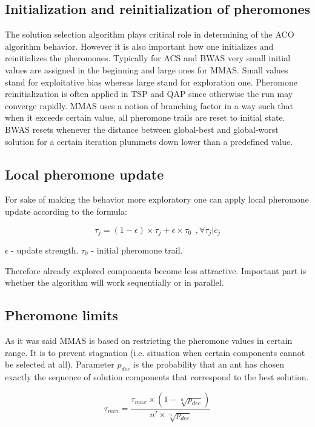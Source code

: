 \subsection{Initialization and reinitialization of pheromones}

The solution selection algorithm plays critical role in determining of the ACO algorithm behavior. However it is also important how one initializes and reinitializes the pheromones. Typically for ACS and BWAS very small initial values are assigned in the beginning and large ones for MMAS. Small values stand for exploitative bias whereas large stand for exploration one. Pheromone reinitialization is often applied in TSP and QAP since otherwise the run may converge rapidly. MMAS uses a notion of branching factor in a way such that when it exceeds certain value, all pheromone trails are reset to initial state. BWAS resets whenever the distance between global-best and global-worst solution for a certain iteration plummets down lower than a predefined value.


\subsection{Local pheromone update}
For sake of making the behavior more exploratory one can apply local pheromone update according to the formula:

\begin{equation}
\tau_j = (1 - \epsilon) \times \tau_j + \epsilon \times \tau_0 \ \ ,\forall \tau_j | c_j
\end{equation}

$\epsilon$ - update strength. $\tau_0$ - initial pheromone trail.

Therefore already explored components become less attractive. Important part is whether the algorithm will work sequentially or in parallel.

\subsection{Pheromone limits}
As it was said MMAS is based on restricting the pheromone values in certain range. It is to prevent stagnation (i.e. situation when certain components cannot be selected at all). Parameter $p_{dec}$ is the probability that an ant has chosen exactly the sequence of solution components that correspond to the best solution.

\begin{equation}
\tau_{min} = \frac{\tau_{max} \times (1 - \sqrt[n]{p_{dec}})}{n' \times \sqrt[n]{p_{dec}}} 
\end{equation}

